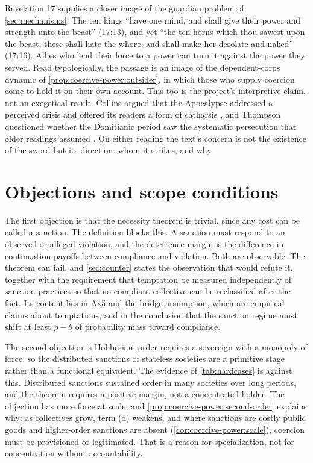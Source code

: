 \documentclass[11pt,letterpaper]{article}
\theoremstyle{definition}
\theoremstyle{remark}
\begin{document}
Revelation 17 supplies a closer image of the guardian problem of \cref{sec:mechanisms}. The ten kings ``have one mind, and shall give their power and strength unto the beast'' (17:13), and yet ``the ten horns which thou sawest upon the beast, these shall hate the whore, and shall make her desolate and naked'' (17:16). Allies who lend their force to a power can turn it against the power they served. Read typologically, the passage is an image of the dependent-corps dynamic of \cref{prop:coercive-power:outsider}, in which those who supply coercion come to hold it on their own account. This too is the project's interpretive claim, not an exegetical result. Collins argued that the Apocalypse addressed a perceived crisis and offered its readers a form of catharsis \citep{collins1984}, and Thompson questioned whether the Domitianic period saw the systematic persecution that older readings assumed \citep{thompson1990}. On either reading the text's concern is not the existence of the sword but its direction: whom it strikes, and why.

\section{Objections and scope conditions}
\label{sec:objections}

The first objection is that the necessity theorem is trivial, since any cost can be called a sanction. The definition blocks this. A sanction must respond to an observed or alleged violation, and the deterrence margin is the difference in continuation payoffs between compliance and violation. Both are observable. The theorem can fail, and \cref{sec:counter} states the observation that would refute it, together with the requirement that temptation be measured independently of sanction practices so that no compliant collective can be reclassified after the fact. Its content lies in Ax5 and the bridge assumption, which are empirical claims about temptations, and in the conclusion that the sanction regime must shift at least $p - \theta$ of probability mass toward compliance.

The second objection is Hobbesian: order requires a sovereign with a monopoly of force, so the distributed sanctions of stateless societies are a primitive stage rather than a functional equivalent. The evidence of \cref{tab:hardcases} is against this. Distributed sanctions sustained order in many societies over long periods, and the theorem requires a positive margin, not a concentrated holder. The objection has more force at scale, and \cref{prop:coercive-power:second-order} explains why: as collectives grow, term (d) weakens, and where sanctions are costly public goods and higher-order sanctions are absent (\cref{cor:coercive-power:scale}), coercion must be provisioned or legitimated. That is a reason for specialization, not for concentration without accountability.
\end{document}
